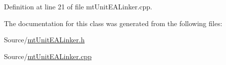 Definition at line 21 of file mt\+Unit\+E\+A\+Linker.\+cpp.



The documentation for this class was generated from the following files\+:\begin{DoxyCompactItemize}
\item 
Source/\mbox{\hyperlink{mt_unit_e_a_linker_8h}{mt\+Unit\+E\+A\+Linker.\+h}}\item 
Source/\mbox{\hyperlink{mt_unit_e_a_linker_8cpp}{mt\+Unit\+E\+A\+Linker.\+cpp}}\end{DoxyCompactItemize}
